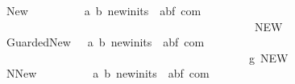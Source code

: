 \begin{isabellebody}
\ \ {\isachardoublequoteopen}{\isacharunderscore}New{\isachardoublequoteclose}\ \ \ \ \ \ \ \ \ {\isacharcolon}{\isacharcolon}\ {\isachardoublequoteopen}{\isacharbrackleft}{\isacharprime}a{\isacharcomma}\ {\isacharprime}b{\isacharcomma}\ newinits{\isacharbrackright}\ {\isasymRightarrow}\ {\isacharparenleft}{\isacharprime}a{\isacharcomma}{\isacharprime}b{\isacharcomma}{\isacharprime}f{\isacharparenright}\ com{\isachardoublequoteclose}\ \isanewline
\ \ \ \ \ \ \ \ \ \ \ \ \ \ \ \ \ \ \ \ \ \ \ \ \ \ \ \ \ \ \ \ \ \ \ \ \ \ \ \ \ \ \ \ {\isacharparenleft}{\isachardoublequoteopen}{\isacharparenleft}{\isacharunderscore}\ {\isacharcolon}{\isacharequal}{\isacharequal}{\isacharslash}{\isacharparenleft}{}\ NEW\ {\isacharunderscore}{\isacharslash}\ {\isacharbrackleft}{\isacharunderscore}{\isacharbrackright}{\isacharparenright}{\isacharparenright}{\isachardoublequoteclose}\ {\isacharbrackleft}{}{}{\isacharcomma}\ {}{}{\isacharcomma}\ {}{\isacharbrackright}\ {}{}{\isacharparenright}\isanewline
\ \ {\isachardoublequoteopen}{\isacharunderscore}GuardedNew{\isachardoublequoteclose}\ \ {\isacharcolon}{\isacharcolon}\ {\isachardoublequoteopen}{\isacharbrackleft}{\isacharprime}a{\isacharcomma}\ {\isacharprime}b{\isacharcomma}\ newinits{\isacharbrackright}\ {\isasymRightarrow}\ {\isacharparenleft}{\isacharprime}a{\isacharcomma}{\isacharprime}b{\isacharcomma}{\isacharprime}f{\isacharparenright}\ com{\isachardoublequoteclose}\ \isanewline
\ \ \ \ \ \ \ \ \ \ \ \ \ \ \ \ \ \ \ \ \ \ \ \ \ \ \ \ \ \ \ \ \ \ \ \ \ \ \ \ \ \ \ \ {\isacharparenleft}{\isachardoublequoteopen}{\isacharparenleft}{\isacharunderscore}\ {\isacharcolon}{\isacharequal}{\isacharequal}\isactrlsub g{\isacharslash}{\isacharparenleft}{}\ NEW\ {\isacharunderscore}{\isacharslash}\ {\isacharbrackleft}{\isacharunderscore}{\isacharbrackright}{\isacharparenright}{\isacharparenright}{\isachardoublequoteclose}\ {\isacharbrackleft}{}{}{\isacharcomma}\ {}{}{\isacharcomma}\ {}{\isacharbrackright}\ {}{}{\isacharparenright}\isanewline
\ \ {\isachardoublequoteopen}{\isacharunderscore}NNew{\isachardoublequoteclose}\ \ \ \ \ \ \ \ \ {\isacharcolon}{\isacharcolon}\ {\isachardoublequoteopen}{\isacharbrackleft}{\isacharprime}a{\isacharcomma}\ {\isacharprime}b{\isacharcomma}\ newinits{\isacharbrackright}\ {\isasymRightarrow}\ {\isacharparenleft}{\isacharprime}a{\isacharcomma}{\isacharprime}b{\isacharcomma}{\isacharprime}f{\isacharparenright}\ com{\isachardoublequoteclose}\ \isanewline

\end{isabellebody}
